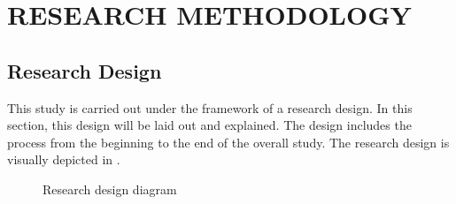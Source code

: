 \chapter{RESEARCH METHODOLOGY}\label{sec:research_methodology}


\section{Research Design}
\noindent This study is carried out under the framework of a research design. In this section, this design will be laid out and explained. The design includes the process from the beginning to the end of the overall study. The research design is visually depicted in .

\begin{figure}[H]
      \centering
      \caption{Research design diagram}\label{fig:research_design_diagram}
\end{figure}

